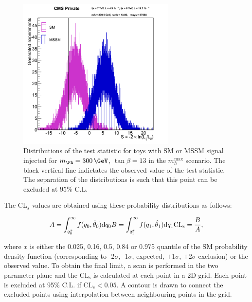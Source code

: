 \begin{figure}[tbh]
\includegraphics[width=0.7\textwidth]{plots/htt-mssm/sigsep_13.png}
\caption[Distributions of the test statistic for toys with SM or MSSM
signal injected for $m_{\PA} = 300\,\GeV$, $\tan\beta = 13$ in the $m_{h}^{\text{max}}$
scenario.]{Distributions of the test statistic for toys with \ac{SM} or
\ac{MSSM} signal injected for $m_{\PA} = 300\,\GeV$, $\tan\beta = 13$ in the $m_{h}^{\text{max}}$
scenario. The black vertical line indictates the observed value of the test
statistic. The separation of the distributions is such that this point can be
excluded at 95$\%$ C.L.}
\label{fig:toydistribution}
\end{figure}

The CL$_{s}$ values are obtained using these probability distributions as
follows:

\begin{equation}
A = \int_{q_{0}^{x}}^{\infty}f(q_{0},\hat{\theta}_{0})\mathrm{d}q_{0}\, \\
B = \int_{q_{1}^{x}}^{\infty}f(q_{1},\hat{\theta}_{1})\mathrm{d}q_{1}\, \\
\mathrm{CL_{s}} = \frac{B}{A},
\end{equation}

where $x$ is either the 0.025, 0.16, 0.5, 0.84 or 0.975 quantile of the SM
probability density function (corresponding to -2$\sigma$, -1$\sigma$, expected,
$+1\sigma$, $+2\sigma$ exclusion) or the observed value. To obtain the final limit, 
a scan is performed in the two parameter plane and
the $\mathrm{CL_{s}}$ is calculated at each point in a 2D grid. Each point is excluded at
95$\%$ C.L. if CL$_{s}<0.05$. A contour is drawn to connect the excluded points
using interpolation between neighbouring points in the grid.

